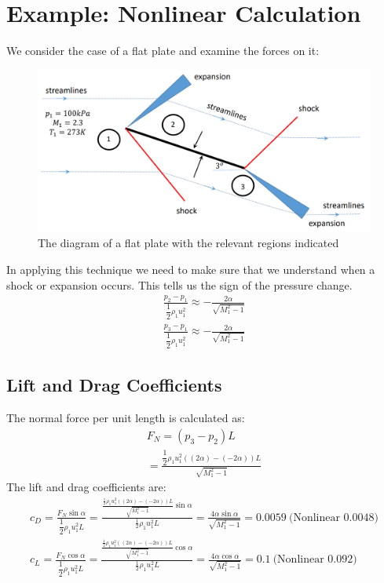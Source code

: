 \documentclass[class=report, crop=false, 12pt,a4paper]{standalone}
\begin{document}
\section{Example: Nonlinear Calculation} 
We consider the case of a flat plate and examine the forces on it: 
\begin{figure}[H]
    \centering
    \includegraphics[width = 0.9 \textwidth]{../img/diagram32.png}
    \caption{The diagram of a flat plate with the relevant regions indicated}
\end{figure}
In applying this technique we need to make sure that we understand when a shock or expansion occurs. This tells us the sign of the pressure change. 
\begin{gather}
    \frac{p_2-p_1}{\dfrac{1}{2}\rho_1 u_1^2} \approx -\frac{2\alpha}{\sqrt{M_1^2-1}} \\[5pt]
    \frac{p_3-p_1}{\dfrac{1}{2}\rho_1 u_1^2} \approx -\frac{2\alpha}{\sqrt{M_1^2-1}}
\end{gather}
\subsection{Lift and Drag Coefficients} 
The normal force per unit length is calculated as: 
\begin{gather}
    F_N = (p_3-p_2)L \\[5pt]
    = \frac{\dfrac{1}{2}\rho_1 u_1^2\left((2\alpha)-(-2\alpha)\right)L}{\sqrt{M_1^2-1}}
\end{gather}
The lift and drag coefficients are: 
\begin{gather}
    c_D = \frac{F_N\sin\alpha}{\dfrac{1}{2}\rho_1 u_1^2 L} = \frac{\frac{\frac{1}{2}\rho_1 u_1^2\left((2\alpha)-(-2\alpha)\right)L}{\sqrt{M_1^2-1}}\sin\alpha}{\frac{1}{2}\rho_1 u_1^2 L} = \frac{4\alpha\sin\alpha}{\sqrt{M_1^2-1}} = 0.0059 \ \text{(Nonlinear 0.0048)} \\[5pt]
    c_L = \frac{F_N\cos\alpha}{\dfrac{1}{2}\rho_1 u_1^2 L} = \frac{\frac{\frac{1}{2}\rho_1 u_1^2\left((2\alpha)-(-2\alpha)\right)L}{\sqrt{M_1^2-1}}\cos\alpha}{\frac{1}{2}\rho_1 u_1^2 L} = \frac{4\alpha\cos\alpha}{\sqrt{M_1^2-1}} = 0.1 \ \text{(Nonlinear 0.092)}
\end{gather}
\end{document}
